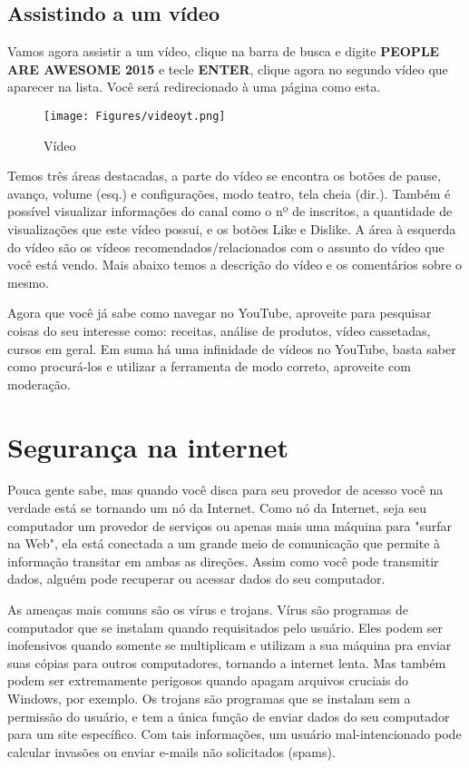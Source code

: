 \documentclass[hidelinks,12pt]{article}
\begin{document}
	\newpage
	\subsection{Assistindo a um vídeo}
	Vamos agora assistir a um vídeo, clique na barra de busca e digite \textbf{PEOPLE ARE AWESOME 2015} e tecle \textbf{ENTER}, clique agora no segundo vídeo que aparecer na lista.	Você será redirecionado à uma página como esta.
	\begin{figure}[!h]
		\centering
		\texttt{[image: Figures/videoyt.png]}
		\label{fig:config}
		\caption{Vídeo}
	\end{figure}
	
	Temos três áreas destacadas, a parte do vídeo se encontra os botões de pause, avanço, volume (esq.) e configurações, modo teatro, tela cheia (dir.).
	Também é possível visualizar informações do canal como o nº de inscritos, a quantidade de visualizações que este vídeo possui, e os botões Like e Dislike. A área à esquerda do vídeo são os vídeos recomendados/relacionados com o assunto do vídeo que você está vendo. Mais abaixo temos a descrição do vídeo e os comentários sobre o mesmo.
	
	Agora que você já sabe como navegar no YouTube, aproveite para pesquisar coisas do seu interesse como: receitas, análise de produtos, vídeo cassetadas, cursos em geral. Em suma há uma infinidade de vídeos no YouTube, basta saber como procurá-los e utilizar a ferramenta de modo correto, aproveite com moderação.
	

	\section{Segurança na internet}

	Pouca gente sabe, mas quando você disca para seu provedor de acesso você na verdade está se tornando um nó da Internet. Como nó da Internet, seja seu computador um provedor de serviços ou apenas mais uma máquina para "surfar na Web", ela está conectada a um grande meio de comunicação que permite à informação transitar em ambas as direções. Assim como você pode transmitir dados, alguém pode recuperar ou acessar dados do seu computador.

	As ameaças mais comuns são os vírus e trojans. Vírus são programas de computador que se instalam quando requisitados pelo usuário. Eles podem ser inofensivos quando somente se multiplicam e utilizam a sua máquina pra enviar suas cópias para outros computadores, tornando a internet lenta. Mas também podem ser extremamente perigosos quando apagam arquivos cruciais do Windows, por exemplo. Os trojans são programas que se instalam sem a permissão do usuário, e tem a única função de enviar dados do seu computador para um site específico. Com tais informações, um usuário mal-intencionado pode calcular invasões ou enviar e-mails não solicitados (spams).
\end{document}
